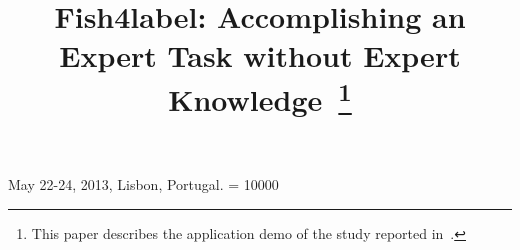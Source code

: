 \documentclass{sig-alternate}
\begin{document}
 {May 22-24, 2013, Lisbon, Portugal.} 
\widowpenalty = 10000

\title{Fish4label: Accomplishing an Expert Task without Expert Knowledge~\thanks{This paper describes the application demo of the study reported in~\cite{jhe13:crowd}.}}


\newif\ifanon
\ifx\anonymous\undefined
  \anonfalse
\else
  \anontrue
\fi

\ifanon
\author{}
\else
\author{
\alignauthor Jiyin He\\
\alignauthor Jacco van Ossenbruggen\\
\alignauthor Arjen P. de Vries\\
\and
   \email{\{j.he, jacco.van.ossenbruggen, arjen.de.vries\}@cwi.nl}
\and   
   \affaddr{Centrum Wiskunde en Informatica, Science Park 123}\\
   \affaddr{1098XG, Amsterdam, the Netherlands}\\
}
\fi


\maketitle
\end{document}
